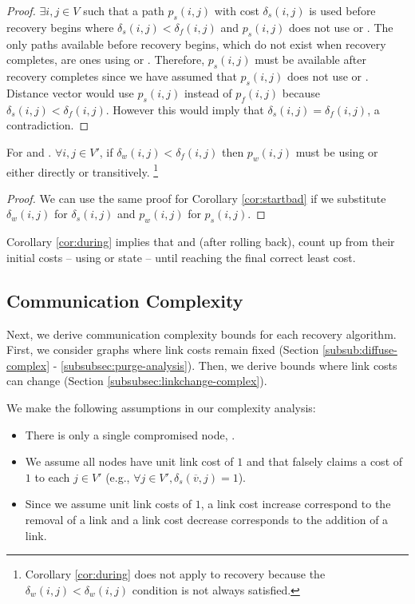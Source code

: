 {\begin{proof}
$\exists i,j\in V$ such that a path $p_{s}(i,j)$ with cost $\delta_{s}(i,j)$ is used before recovery begins where
$\delta_{s}(i,j) < \delta_f(i,j)$ and  $p_{s}(i,j)$ does not use \badvector or \oldvectors.  The only paths available before recovery begins, which do not 
exist when recovery completes, are ones using \badvector or \oldvectors. Therefore, $p_{s}(i,j)$ must be available after recovery completes since we have assumed that
$p_{s}(i,j)$ does not use \badvector or \oldvectors. Distance vector would use  $p_{s}(i,j)$ instead of $p_f(i,j)$ because 
$\delta_{s}(i,j) < \delta_f(i,j)$.  However this would imply that $\delta_{s}(i,j)= \delta_f(i,j)$, a contradiction.
\end{proof}

\begin{corollary}
For \second and \cprs. $\forall i,j \in V'$, if $\delta_w(i,j) < \delta_f(i,j)$ then $p_w(i,j)$  must be using \badvector or \oldvector either directly or transitively.
{\footnote {\small Corollary \ref{cor:during} does not apply to \purge recovery because the  $\delta_w(i,j) < \delta_w(i,j)$ condition is not always satisfied.}} 
\label{cor:during}
\end{corollary}

\begin{proof}
We can use the same proof for Corollary \ref{cor:startbad} if we substitute $\delta_w(i,j)$ for $\delta_s(i,j)$ and $p_w(i,j)$ for $p_s(i,j)$.
\end{proof}

Corollary \ref{cor:during} implies that \second and \cpr (after rolling back), count up from their initial costs -- using \badvector or \oldvector state -- until 
reaching the final correct least cost.



\subsection{Communication Complexity}
\label{subsec:complex}

Next, we derive communication complexity bounds for each recovery algorithm. First, we consider graphs where link costs remain fixed
(Section \ref{subsub:diffuse-complex} - \ref{subsubsec:purge-analysis}). Then, we derive bounds where link costs can change (Section \ref{subsubsec:linkchange-complex}).

We make the following assumptions in our complexity analysis:
\begin{itemize}
	\item There is only a single compromised node, \bads.
	\item We assume all nodes have unit link cost of $1$ and that \bad falsely claims a cost of $1$ to each $j \in V'$ (e.g., $\forall j \in V', \delta_s(\overline{v},j) = 1$).
	\item Since we assume unit link costs of $1$, a link cost increase correspond to the removal of a link and a link cost decrease corresponds to the addition of a link.
\end{itemize}

}

